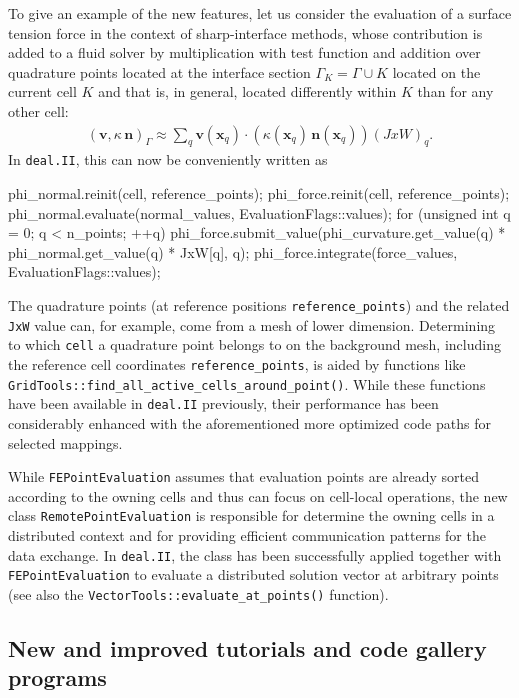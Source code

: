 \documentclass{ansarticle-preprint}
\newcommand{\specialword}[1]{\texttt{#1}}
\newcommand{\dealii}{{\specialword{deal.II}}\xspace}
\begin{document}
To give an example of the new features, let us consider the evaluation of a
surface tension force in the context of sharp-interface methods, whose
contribution is added to a fluid solver by multiplication with test function
and addition over quadrature points located at the interface section
$\Gamma_K=\Gamma \cup K$ located on the current cell $K$ and that is,
in general, located differently within $K$ than for any other cell:
\begin{align*}
\left(\mathbf{v}, \kappa \, \mathbf{n}\right)_\Gamma
\approx
\sum_q \mathbf{v}(\mathbf{x}_q) \cdot \left(\kappa(\mathbf{x}_q) \, \mathbf{n}(\mathbf{x}_q)\right) (JxW)_q.
\end{align*}
In \dealii{}, this can now be conveniently written as
\begin{c++}
phi_normal.reinit(cell, reference_points);
phi_force.reinit(cell, reference_points);
phi_normal.evaluate(normal_values, EvaluationFlags::values);
for (unsigned int q = 0; q < n_points; ++q)
   phi_force.submit_value(phi_curvature.get_value(q) *
                          phi_normal.get_value(q) * JxW[q], q);
phi_force.integrate(force_values, EvaluationFlags::values);
\end{c++}
The quadrature points (at reference positions
\texttt{reference\_points}) and the related \texttt{JxW} value can,
for example, come from
a mesh of lower dimension. Determining to which \texttt{cell} a quadrature
point belongs to on the background mesh, including the reference cell
coordinates \texttt{reference\_points}, is aided by functions like
\texttt{GridTools::find\_all\_active\_cells\_around\_point()}. While these
functions have been available in \dealii{} previously, their performance has
been considerably enhanced with the aforementioned more optimized code paths
for selected mappings.

While \texttt{FEPointEvaluation} assumes that evaluation points are already sorted according to 
the owning cells and thus can focus on cell-local operations, the new class
\texttt{RemotePointEvaluation} is responsible for determine the owning cells in a distributed
context and for providing efficient communication patterns for the data exchange. In \texttt{deal.II},
the class has been successfully applied together with \texttt{FEPointEvaluation} to evaluate a distributed
solution vector at arbitrary points (see also the
\texttt{VectorTools::evaluate\_at\_points()} function).


\subsection{New and improved tutorials and code gallery programs}
\label{subsec:steps}
\end{document}
